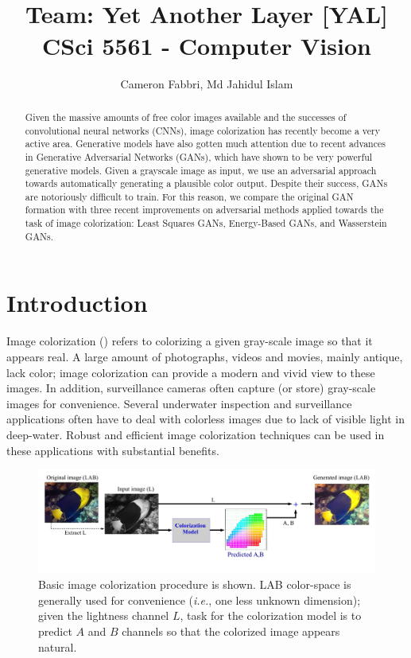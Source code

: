 \documentclass{article} %
\title{\textbf{\doctitle}\\
\small {Team: Yet Another Layer [YAL]} \\
\small CSci 5561 - Computer Vision }
\author{Cameron Fabbri, Md Jahidul Islam}
\date{}
\begin{document}
\maketitle

\begin{abstract}
Given the massive amounts of free color images available and the successes of convolutional neural networks (CNNs),
image colorization has recently become a very active area. Generative models have also gotten much attention due to
recent advances in Generative Adversarial Networks (GANs), which have shown to be very powerful generative models.
Given a grayscale image as input, we use an adversarial approach towards automatically generating a plausible color
output. Despite their success, GANs are notoriously difficult to train. For this reason, we compare the original GAN
formation with three recent improvements on adversarial methods applied towards the task of image colorization:
Least Squares GANs, Energy-Based GANs, and Wasserstein GANs.
\end{abstract}

\section{Introduction}\label{sec:intro}
Image colorization (\cite{zhang2016colorful, cheng2015deep, bugeau2014variational}) refers to colorizing a given gray-scale image so that it appears real. 
A large amount of photographs, videos and movies, mainly antique, lack color; image colorization can provide a modern and vivid view to these images. In addition, surveillance cameras often capture (or store) gray-scale images for convenience. Several underwater inspection and surveillance applications \cite{lu2013underwater, torres2005color} often have to deal with colorless images due to lack of visible light in deep-water. Robust and efficient image colorization techniques can be used in these applications with substantial benefits.   

\begin{figure}[h]
\vspace{-3mm}
\centering
\includegraphics[width=\linewidth]{Figs/6.pdf}
\vspace{-13mm}
\caption{Basic image colorization procedure is shown. LAB color-space is generally used for convenience (\textit{i.e.}, one less unknown dimension); given the lightness channel $L$, task for the colorization model is to predict $A$ and $B$ channels so that the colorized image appears natural. }
\label{fig:col}
\end{figure}  
\end{document}
